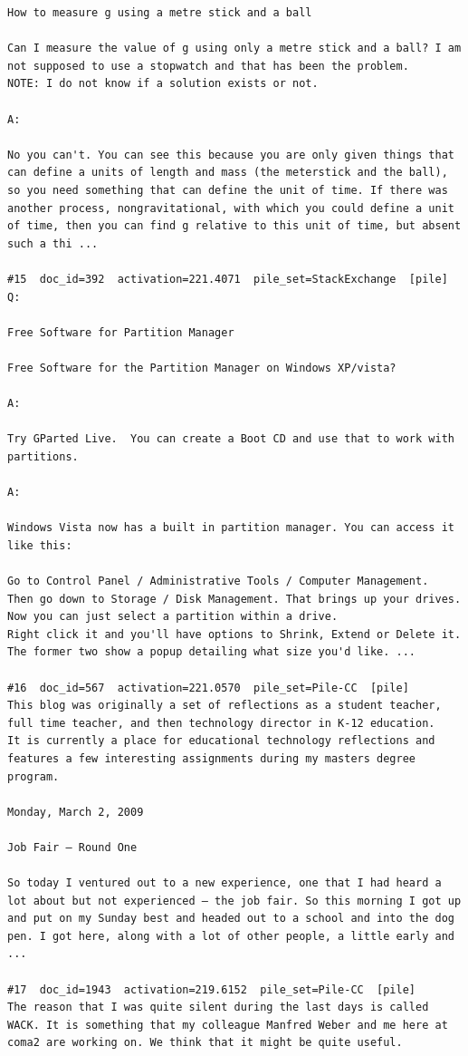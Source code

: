 \begin{verbatim}
How to measure g using a metre stick and a ball

Can I measure the value of g using only a metre stick and a ball? I am not supposed to use a stopwatch and that has been the problem.
NOTE: I do not know if a solution exists or not.

A:

No you can't. You can see this because you are only given things that can define a units of length and mass (the meterstick and the ball), so you need something that can define the unit of time. If there was another process, nongravitational, with which you could define a unit of time, then you can find g relative to this unit of time, but absent such a thi ...

#15  doc_id=392  activation=221.4071  pile_set=StackExchange  [pile]
Q:

Free Software for Partition Manager

Free Software for the Partition Manager on Windows XP/vista?  

A:

Try GParted Live.  You can create a Boot CD and use that to work with partitions.

A:

Windows Vista now has a built in partition manager. You can access it like this:

Go to Control Panel / Administrative Tools / Computer Management. 
Then go down to Storage / Disk Management. That brings up your drives. 
Now you can just select a partition within a drive.
Right click it and you'll have options to Shrink, Extend or Delete it. The former two show a popup detailing what size you'd like. ...

#16  doc_id=567  activation=221.0570  pile_set=Pile-CC  [pile]
This blog was originally a set of reflections as a student teacher, full time teacher, and then technology director in K-12 education.
It is currently a place for educational technology reflections and features a few interesting assignments during my masters degree program.

Monday, March 2, 2009

Job Fair – Round One

So today I ventured out to a new experience, one that I had heard a lot about but not experienced – the job fair. So this morning I got up and put on my Sunday best and headed out to a school and into the dog pen. I got here, along with a lot of other people, a little early and ...

#17  doc_id=1943  activation=219.6152  pile_set=Pile-CC  [pile]
The reason that I was quite silent during the last days is called WACK. It is something that my colleague Manfred Weber and me here at coma2 are working on. We think that it might be quite useful.


\end{verbatim}

